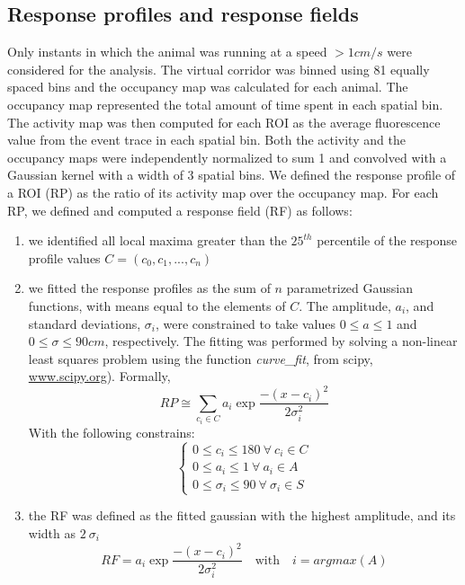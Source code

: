 \subsection{Response profiles and response fields}
\label{chap3:sec:7:subsec1:PF_and_response_profiles}
Only instants in which the animal was running at a speed $> 1 cm/s$ were considered for the analysis. 
The virtual corridor was binned using 81 equally spaced bins and the occupancy map was calculated for each animal. 
The occupancy map represented the total amount of time spent in each spatial bin. 
The activity map was then computed for each ROI as the average fluorescence value from the event trace in each spatial bin. 
Both the activity and the occupancy maps were independently normalized to sum 1 and convolved with a Gaussian kernel with a width of 3 spatial bins. 
We defined the response profile of a ROI (RP) as the ratio of its activity map over the occupancy map. 
For each RP, we defined and computed a response field (RF) as follows: 
\begin{enumerate}[label=\roman*)]
    \item we identified all local maxima greater than the $25^{th}$ percentile of the response profile values  $C = (c_0, c_1, ... , c_n)$
    \item we fitted the response profiles as the sum of $n$ parametrized Gaussian functions, with means equal to the elements of $C$.
    The amplitude, $a_i$, and standard deviations, $\sigma_i$, were constrained to take values $ 0 \leq a \leq 1 $ and $0 \leq \sigma \leq 90 cm$, respectively. 
    The fitting was performed by solving a non-linear least squares problem using the function \textit{curve\_fit}, from scipy, \url{www.scipy.org}).
    Formally,
    \begin{equation}
        RP \cong \sum_{c_i\in C} a_i\exp{\frac{-(x-c_i)^2}{2\sigma_i^2}}
    \end{equation}
    With the following constrains: 
    \begin{equation}
        \begin{cases}
            0\leq c_i \leq 180\ \forall\ c_i \in C \\
                0\leq a_i \leq 1\ \forall\ a_i \in A \\
                    0\leq \sigma_i \leq 90\ \forall\ \sigma_i \in S
        \end{cases}
    \end{equation}
    \item the RF was defined as the fitted gaussian with the highest amplitude, and its width as $2\ \sigma_i$
    \begin{equation}
        RF = a_i\exp{\frac{-(x-c_i)^2}{2\sigma_i^2}} \quad \text{with} \quad  i=argmax(A)
    \end{equation}
\end{enumerate}
